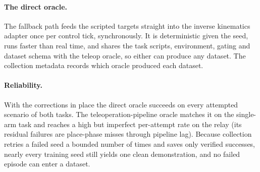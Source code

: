 \paragraph{The direct oracle.}
The fallback path feeds the scripted targets straight into the inverse
kinematics adapter once per control tick, synchronously. It is
deterministic given the seed, runs faster than real time, and shares the
task scripts, environment, gating and dataset schema with the teleop
oracle, so either can produce any dataset. The collection metadata
records which oracle produced each dataset.

\paragraph{Reliability.}
With the corrections in place the direct oracle succeeds on every
attempted scenario of both tasks. The teleoperation-pipeline oracle
matches it on the single-arm task and reaches a high but imperfect
per-attempt rate on the relay (its residual failures are place-phase
misses through pipeline lag). Because collection retries a failed seed a
bounded number of times and saves only verified successes, nearly every
training seed still yields one clean demonstration, and no failed
episode can enter a dataset.
